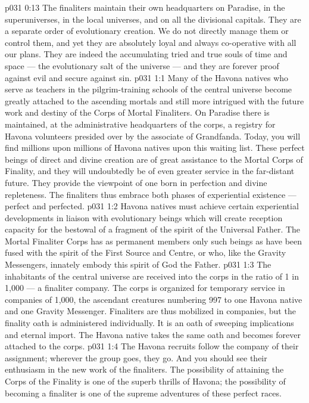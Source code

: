 \vs p031 0:13 The finaliters maintain their own headquarters on Paradise, in the superuniverses, in the local universes, and on all the divisional capitals. They are a separate order of evolutionary creation. We do not directly manage them or control them, and yet they are absolutely loyal and always co\hyp{}operative with all our plans. They are indeed the accumulating tried and true souls of time and space --- the evolutionary salt of the universe --- and they are forever proof against evil and secure against sin.
\vs p031 1:1 Many of the Havona natives who serve as teachers in the pilgrim\hyp{}training schools of the central universe become greatly attached to the ascending mortals and still more intrigued with the future work and destiny of the Corps of Mortal Finaliters. On Paradise there is maintained, at the administrative headquarters of the corps, a registry for Havona volunteers presided over by the associate of Grandfanda. Today, you will find millions upon millions of Havona natives upon this waiting list. These perfect beings of direct and divine creation are of great assistance to the Mortal Corps of Finality, and they will undoubtedly be of even greater service in the far\hyp{}distant future. They provide the viewpoint of one born in perfection and divine repleteness. The finaliters thus embrace both phases of experiential existence --- perfect and perfected.
\vs p031 1:2 Havona natives must achieve certain experiential developments in liaison with evolutionary beings which will create reception capacity for the bestowal of a fragment of the spirit of the Universal Father. The Mortal Finaliter Corps has as permanent members only such beings as have been fused with the spirit of the First Source and Centre, or who, like the Gravity Messengers, innately embody this spirit of God the Father.
\vs p031 1:3 The inhabitants of the central universe are received into the corps in the ratio of 1 in 1,000 --- a finaliter company. The corps is organized for temporary service in companies of 1,000, the ascendant creatures numbering 997 to one Havona native and one Gravity Messenger. Finaliters are thus mobilized in companies, but the finality oath is administered individually. It is an oath of sweeping implications and eternal import. The Havona native takes the same oath and becomes forever attached to the corps.
\vs p031 1:4 The Havona recruits follow the company of their assignment; wherever the group goes, they go. And you should see their enthusiasm in the new work of the finaliters. The possibility of attaining the Corps of the Finality is one of the superb thrills of Havona; the possibility of becoming a finaliter is one of the supreme adventures of these perfect races.
